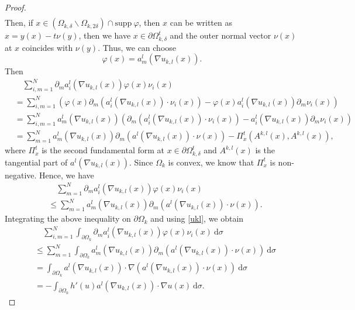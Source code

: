 \documentclass[10pt,a4paper]{amsart}
\numberwithin{equation}{section}
\newcommand{\pa}{\partial}
\begin{document}
\begin{proof}
\begin{align*}
    \end{align*}
    Then, if $x \in (\Omega_{k,\delta} \backslash \Omega_{k, 2\delta}) \cap \text{supp} \ \varphi $, then $x$ can be written as $x = y(x)-t\nu(y)$, then we have $x \in \pa \Omega_{k,\delta}^{t}$ and the outer normal vector $\nu(x)$ at $x$ coincides with $\nu(y)$. Thus, we can choose $$\varphi(x) = a_m^l(\nabla u_{k,l}(x)).$$ 
    Then
    \begin{align*}
        & \quad \sum_{i,m=1}^{N} \pa_m a_i^l(\nabla u_{k,l}(x))\varphi(x) \nu_i(x) \\
        &= \sum_{i,m=1}^{N} \left(\varphi(x) \pa_m  (a^l_i(\nabla u_{k,l}(x)) \cdot \nu_i(x)) - \varphi(x) a_i^l(\nabla u_{k,l}(x)) \pa_m \nu_i(x) \right)\\
        & = \sum_{i,m=1}^{N} a_m^l(\nabla u_{k,l}(x)) \left( \pa_m  (a^l_i(\nabla u_{k,l}(x)) \cdot \nu_i(x))  - a_i^l(\nabla u_{k,l}(x)) \pa_m \nu_i(x) \right)\\
        & = \sum_{m=1}^{N} a_m^l(\nabla u_{k,l}(x)) \pa_m  (a^l(\nabla u_{k,l}(x)) \cdot \nu(x)) - \Pi_x^t(A^{k,l}(x), A^{k,l}(x)),
    \end{align*}
    where $\Pi_{x}^{t}$ is the second fundamental form at $x \in \pa \Omega_{k,\delta}^{t}$ and $A^{k,l}(x)$ is the tangential part of $a^l(\nabla u_{k,l}(x))$. Since $\Omega_k$ is convex, we know that $\Pi_{x}^t$ is non-negative. Hence, we have
    \begin{align*}
        & \quad \sum_{m=1}^{N} \pa_m a_i^l(\nabla u_{k,l}(x))\varphi(x) \nu_i(x)  \\
        & \leq \sum_{m=1}^{N} a_m^l(\nabla u_{k,l}(x)) \pa_m  (a^l(\nabla u_{k,l}(x)) \cdot \nu(x)).
    \end{align*}
    Integrating the above inequality on $\pa \Omega_k$ and using \eqref{ukl}, we obtain
    \begin{align}\label{test3}
        & \quad \sum_{i,m=1}^{N} \int_{\pa \Omega_k}\pa_m a_i^l(\nabla u_{k,l}(x))\varphi(x) \nu_i(x) \ \text{d} \sigma \nonumber \\
        & \leq \sum_{m=1}^{N} \int_{\pa \Omega_k} a_m^l(\nabla u_{k,l}(x)) \pa_m  (a^l(\nabla u_{k,l}(x)) \cdot \nu(x)) \ \text{d} \sigma \nonumber \\
        & = \int_{\pa \Omega_k} a^l(\nabla u_{k,l}(x)) \cdot  \nabla (a^l(\nabla u_{k,l}(x)) \cdot \nu(x)) \ \text{d} \sigma \\
        & = -  \int_{\pa \Omega_k} h'(u)a^l(\nabla u_{k,l}(x)) \cdot  \nabla u(x) \ \text{d} \sigma. \nonumber
    \end{align}

\end{proof}
\end{document}
